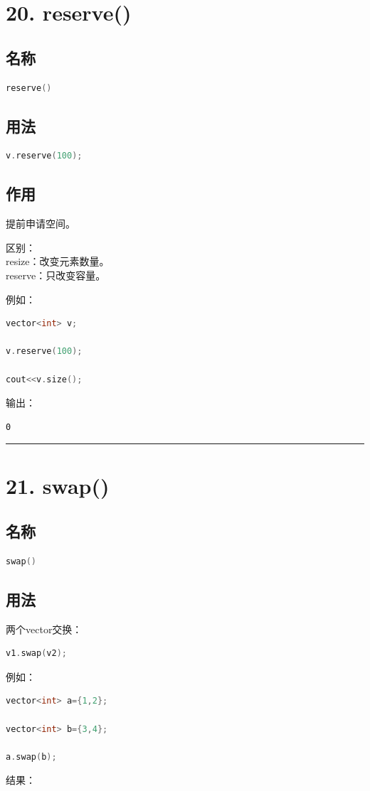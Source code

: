 \documentclass[10pt,twocolumn]{extarticle}
\begin{document}
\section{20. reserve()}

\subsection{名称}
\begin{lstlisting}[language=C++]
reserve()
\end{lstlisting}

\subsection{用法}
\begin{lstlisting}[language=C++]
v.reserve(100);
\end{lstlisting}

\subsection{作用}
提前申请空间。

区别：\\
resize：改变元素数量。\\
reserve：只改变容量。

例如：
\begin{lstlisting}[language=C++]
vector<int> v;

v.reserve(100);

cout<<v.size();
\end{lstlisting}
输出：
\begin{lstlisting}
0
\end{lstlisting}

\noindent\rule{\linewidth}{0.4pt}

\section{21. swap()}

\subsection{名称}
\begin{lstlisting}[language=C++]
swap()
\end{lstlisting}

\subsection{用法}
两个vector交换：
\begin{lstlisting}[language=C++]
v1.swap(v2);
\end{lstlisting}
例如：
\begin{lstlisting}[language=C++]
vector<int> a={1,2};

vector<int> b={3,4};

a.swap(b);
\end{lstlisting}
结果：
\end{document}
